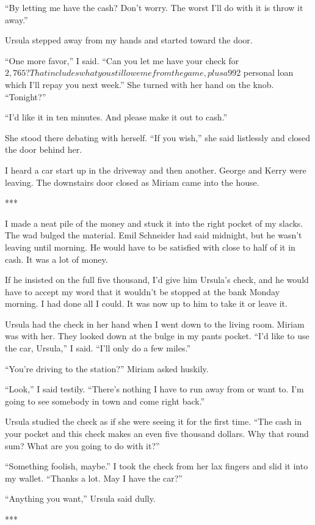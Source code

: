 {“By letting me have the cash? Don’t worry. The worst I’ll do with it is throw it away.”

Ursula stepped away from my hands and started toward the door.

“One more favor,” I said. “Can you let me have your check for $2,765? That includes what you still owe me from the game, plus a $992 personal loan which I’ll repay you next week.” She turned with her hand on the knob. “Tonight?”

“I’d like it in ten minutes. And please make it out to cash.”

She stood there debating with herself. “If you wish,” she said listlessly and closed the door behind her.

I heard a car start up in the driveway and then another. George and Kerry were leaving. The downstairs door closed as Miriam came into the house.

***

I made a neat pile of the money and stuck it into the right pocket of my slacks. The wad bulged the material. Emil Schneider had said midnight, but he wasn’t leaving until morning. He would have to be satisfied with close to half of it in cash. It was a lot of money.

If he insisted on the full five thousand, I’d give him Ursula’s check, and he would have to accept my word that it wouldn’t be stopped at the bank Monday morning. I had done all I could. It was now up to him to take it or leave it.

Ursula had the check in her hand when I went down to the living room. Miriam was with her. They looked down at the bulge in my pants pocket. “I’d like to use the car, Ursula,” I said. “I’ll only do a few miles.”

“You’re driving to the station?” Miriam asked huskily.

“Look,” I said testily. “There’s nothing I have to run away from or want to. I’m going to see somebody in town and come right back.”

Ursula studied the check as if she were seeing it for the first time. “The cash in your pocket and this check makes an even five thousand dollars. Why that round sum? What are you going to do with it?”

“Something foolish, maybe.” I took the check from her lax fingers and slid it into my wallet. “Thanks a lot. May I have the car?”

“Anything you want,” Ursula said dully.

***

}
